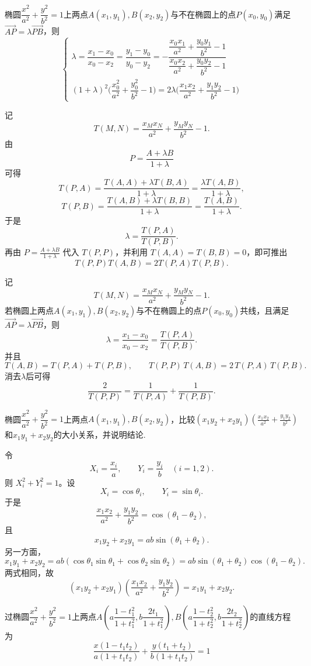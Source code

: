 \begin{conclusion}
\noindent 椭圆$\dfrac{x^2}{a^2}+\dfrac{y^2}{b^2}=1$上两点$A(x_1,y_1),B(x_2,y_2)$与不在椭圆上的点$P(x_0,y_0)$满足$\overrightarrow{AP}=\lambda\overrightarrow{PB}$，则
\[\begin{cases}\lambda=\dfrac{x_1-x_0}{x_0-x_2}=\dfrac{y_1-y_0}{y_0-y_2}=-\dfrac{\dfrac{x_0x_1}{a^2}+\dfrac{y_0y_1}{b^2}-1}{\dfrac{x_0x_2}{a^2}+\dfrac{y_0y_2}{b^2}-1}\\(1+\lambda)^2\bigg(\dfrac{x_0^2}{a^2}+\dfrac{y_0^2}{b^2}-1\bigg)=2\lambda\bigg(\dfrac{x_1x_2}{a^2}+\dfrac{y_1y_2}{b^2}-1\bigg)\end{cases}\]
\end{conclusion}
\begin{myproof}
记
\[
T(M,N)=\frac{x_Mx_N}{a^2}+\frac{y_My_N}{b^2}-1.
\]
由
\[
P=\frac{A+\lambda B}{1+\lambda}
\]
可得
\[
T(P,A)=\frac{T(A,A)+\lambda T(B,A)}{1+\lambda}
=\frac{\lambda T(A,B)}{1+\lambda},
\]
\[
T(P,B)=\frac{T(A,B)+\lambda T(B,B)}{1+\lambda}
=\frac{T(A,B)}{1+\lambda}.
\]
于是
\[
\lambda=\frac{T(P,A)}{T(P,B)}.
\]
再由 $P=\frac{A+\lambda B}{1+\lambda}$ 代入 $T(P,P)$，并利用 $T(A,A)=T(B,B)=0$，即可推出
\[
T(P,P)T(A,B)=2T(P,A)T(P,B).
\]
\end{myproof}

\begin{conclusion}
\noindent 记
\[
T(M, N) = \dfrac{x_M x_N}{a^2} + \dfrac{y_M y_N}{b^2} - 1.
\]
若椭圆上两点$A(x_1,y_1), B(x_2,y_2)$与不在椭圆上的点$P(x_0,y_0)$共线，且满足$\overrightarrow{AP} = \lambda \overrightarrow{PB}$，则
\[
\lambda = \dfrac{x_1-x_0}{x_0-x_2} = \dfrac{T(P,A)}{T(P,B)}.
\]
并且
\[
T(A,B)=T(P,A)+T(P,B),\qquad T(P,P)\,T(A,B)=2\,T(P,A)\,T(P,B).
\]
消去$\lambda$后可得
\[
\dfrac{2}{T(P,P)} = \dfrac{1}{T(P,A)} + \dfrac{1}{T(P,B)}.
\]
\end{conclusion}


\begin{example}[比较关系]
    椭圆$\dfrac{x^2}{a^2}+\dfrac{y^2}{b^2}=1$上两点$A(x_1,y_1),B(x_2,y_2)$，比较$(x_1y_2+x_2y_1)\left(\frac{x_1x_2}{a^2}+\frac{y_1y_2}{b^2}\right)$和$x_1y_1+x_2y_2$的大小关系，并说明结论.
\end{example}
\begin{solution}
令
\[
X_i=\frac{x_i}{a},\qquad Y_i=\frac{y_i}{b}\quad(i=1,2).
\]
则 $X_i^2+Y_i^2=1$。设
\[
X_i=\cos\theta_i,\qquad Y_i=\sin\theta_i.
\]
于是
\[
\frac{x_1x_2}{a^2}+\frac{y_1y_2}{b^2}
=\cos(\theta_1-\theta_2),
\]
且
\[
x_1y_2+x_2y_1=ab\sin(\theta_1+\theta_2).
\]
另一方面，
\[
x_1y_1+x_2y_2
=ab(\cos\theta_1\sin\theta_1+\cos\theta_2\sin\theta_2)
=ab\sin(\theta_1+\theta_2)\cos(\theta_1-\theta_2).
\]
两式相同，故
\[
(x_1y_2+x_2y_1)\left(\frac{x_1x_2}{a^2}+\frac{y_1y_2}{b^2}\right)
=x_1y_1+x_2y_2.
\]
\end{solution}

\begin{conclusion}[参数方程]
    过椭圆$\dfrac{x^2}{a^2}+\dfrac{y^2}{b^2}=1$上两点$A\left(a\dfrac{1-t_1^2}{1+t_1^2},b\dfrac{2t_1}{1+t_1^2}\right),B\left(a\dfrac{1-t_2^2}{1+t_2^2},b\dfrac{2t_2}{1+t_2^2}\right)$的直线方程为\[\dfrac{x(1-t_1t_2)}{a(1+t_1t_2)}+\dfrac{y(t_1+t_2)}{b(1+t_1t_2)}=1\]
\end{conclusion}


